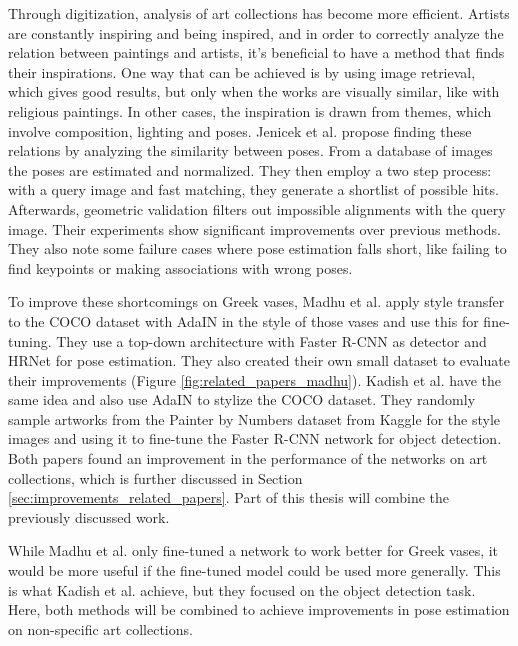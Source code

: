Through digitization, analysis of art collections has become more efficient.
Artists are constantly inspiring and being inspired, and in order to correctly analyze the relation between paintings and artists, it's beneficial to have a method that finds their inspirations.
One way that can be achieved is by using image retrieval, which gives good results, but only when the works are visually similar, like with religious paintings.
In other cases, the inspiration is drawn from themes, which involve composition, lighting and poses.
Jenicek et al. \cite{Jenicek2019} propose finding these relations by analyzing the similarity between poses.
From a database of images the poses are estimated and normalized.
They then employ a two step process: with a query image and fast matching, they generate a shortlist of possible hits.
Afterwards, geometric validation filters out impossible alignments with the query image.
Their experiments show significant improvements over previous methods.
They also note some failure cases where pose estimation falls short, like failing to find keypoints or making associations with wrong poses.

\begin{figure}[h]
	\centering
\end{figure}

To improve these shortcomings on Greek vases, Madhu et al. \cite{Madhu2020} apply style transfer to the COCO dataset with AdaIN in the style of those vases and use this for fine-tuning.
They use a top-down architecture with Faster R-CNN as detector and HRNet for pose estimation.
They also created their own small dataset to evaluate their improvements (Figure \ref{fig:related_papers_madhu}).
Kadish et al. \cite{Kadish2021} have the same idea and also use AdaIN to stylize the COCO dataset.
They randomly sample artworks from the Painter by Numbers dataset from Kaggle \cite{PainterByNumbers} for the style images and using it to fine-tune the Faster R-CNN network for object detection.
Both papers found an improvement in the performance of the networks on art collections, which is further discussed in Section \ref{sec:improvements_related_papers}.
Part of this thesis will combine the previously discussed work.

While Madhu et al. only fine-tuned a network to work better for Greek vases, it would be more useful if the fine-tuned model could be used more generally.
This is what Kadish et al. achieve, but they focused on the object detection task.
Here, both methods will be combined to achieve improvements in pose estimation on non-specific art collections.